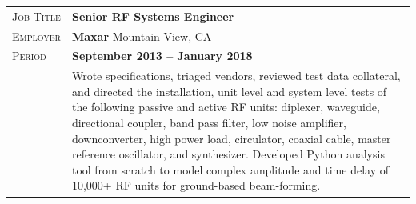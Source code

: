 \documentclass[a4paper, oneside, final]{scrartcl}
\newcommand{\gray}{\rowcolor[gray]{.90}} %
\begin{document}
\begin{center}
\begin{tabularx}{0.97\linewidth}{>{\raggedleft\scshape}p{2cm}X}
\gray Job Title & \textbf{Senior RF Systems Engineer}\\
\gray Employer & \textbf{Maxar} \hfill Mountain View, CA\\
\gray Period & \textbf{September 2013 -- January 2018}\\
&
\vspace{-0.15 cm}
Wrote specifications, triaged vendors, reviewed test data collateral, and directed the installation, unit level and system level tests of the following passive and active RF units: diplexer, waveguide, directional coupler, band pass filter, low noise amplifier, downconverter, high power load, circulator, coaxial cable, master reference oscillator, and synthesizer.
\newline
\newline
Developed Python analysis tool from scratch to model complex amplitude and time delay of 10,000+ RF units for ground-based beam-forming.
\end{tabularx}



\end{center}
\end{document}
